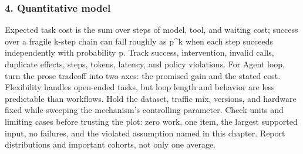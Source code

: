 \subsubsection*{4. Quantitative model}
Expected task cost is the sum over steps of model, tool, and waiting cost; success over a fragile k-step chain can fall roughly as p\textasciicircum{}k when each step succeeds independently with probability p. Track success, intervention, invalid calls, duplicate effects, steps, tokens, latency, and policy violations.
For Agent loop, turn the prose tradeoff into two axes: the promised gain and the stated cost. Flexibility handles open-ended tasks, but loop length and behavior are less predictable than workflows. Hold the dataset, traffic mix, versions, and hardware fixed while sweeping the mechanism's controlling parameter.
Check units and limiting cases before trusting the plot: zero work, one item, the largest supported input, no failures, and the violated assumption named in this chapter. Report distributions and important cohorts, not only one average.
